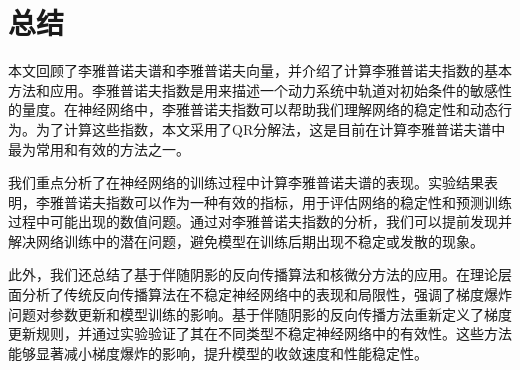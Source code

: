 
\chapter{总结}

本文回顾了李雅普诺夫谱和李雅普诺夫向量，并介绍了计算李雅普诺夫指数的基本方法和应用。李雅普诺夫指数是用来描述一个动力系统中轨道对初始条件的敏感性的量度。在神经网络中，李雅普诺夫指数可以帮助我们理解网络的稳定性和动态行为。为了计算这些指数，本文采用了QR分解法，这是目前在计算李雅普诺夫谱中最为常用和有效的方法之一。

我们重点分析了在神经网络的训练过程中计算李雅普诺夫谱的表现。实验结果表明，李雅普诺夫指数可以作为一种有效的指标，用于评估网络的稳定性和预测训练过程中可能出现的数值问题。通过对李雅普诺夫指数的分析，我们可以提前发现并解决网络训练中的潜在问题，避免模型在训练后期出现不稳定或发散的现象。

此外，我们还总结了基于伴随阴影的反向传播算法和核微分方法的应用。在理论层面分析了传统反向传播算法在不稳定神经网络中的表现和局限性，强调了梯度爆炸问题对参数更新和模型训练的影响。基于伴随阴影的反向传播方法重新定义了梯度更新规则，并通过实验验证了其在不同类型不稳定神经网络中的有效性。这些方法能够显著减小梯度爆炸的影响，提升模型的收敛速度和性能稳定性。